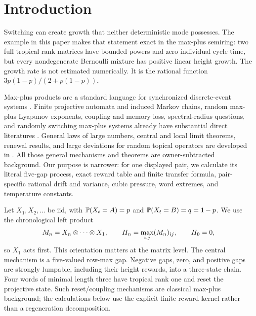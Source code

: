\section{Introduction}
\label{sec:introduction}
\enlargethispage{7pt}

Switching can create growth that neither deterministic mode possesses.  The
example in this paper makes that statement exact in the max-plus semiring:
two full tropical-rank matrices have bounded powers and zero individual
cycle time, but every nondegenerate Bernoulli mixture has positive linear
height growth.  The growth rate is not estimated numerically.  It is the
rational function $3p(1-p)/(2+p(1-p))$.

Max-plus products are a standard language for synchronized discrete-event
systems \cite{BaccelliEtAl1992}.  Finite projective automata and induced
Markov chains, random max-plus Lyapunov exponents, coupling and memory loss,
spectral-radius questions, and randomly switching max-plus systems already
have substantial direct literatures
\cite{Gaubert1995,Mairesse1997,BaccelliHong2000,
BlondelGaubertTsitsiklis2000,MerletProjective2010,
GoverdeHeidergottMerlet2011,vanDenBoomDeSchutter2012,
KordonisMaragosPapavassilopoulos2018}.  General laws of large numbers,
central and local limit theorems, renewal results, and large deviations for
random topical operators are developed in
\cite{Merlet2005,Merlet2007,Merlet2010}.  All those general mechanisms and
theorems are owner-subtracted background.  Our purpose is narrower: for one
displayed pair, we calculate its literal five-gap process, exact reward
table and finite transfer formula, pair-specific rational drift and
variance, cubic pressure, word extremes, and temperature constants.

Let $X_1,X_2,\ldots$ be iid, with $\mathbb{P}(X_t=A)=p$ and
$\mathbb{P}(X_t=B)=q=1-p$.  We use the chronological left product
\[
 M_n=X_n\otimes\cdots\otimes X_1,
 \qquad H_n=\max_{i,j}(M_n)_{ij},
 \qquad H_0=0,
\]
so $X_1$ acts first.  This orientation matters at the matrix level.  The
central mechanism is a five-valued row-max gap.  Negative gaps, zero, and
positive gaps are strongly lumpable, including their height rewards, into a
three-state chain.  Four words of minimal length three have tropical rank
one and reset the projective state.  Such reset/coupling mechanisms are
classical max-plus background; the calculations below use the explicit
finite reward kernel rather than a regeneration decomposition.

